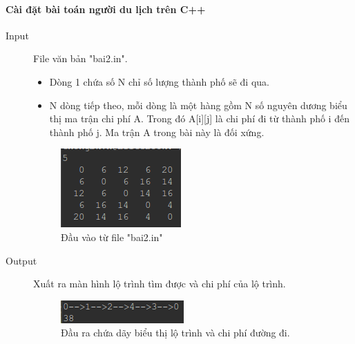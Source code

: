 \documentclass[8pt, a4paper]{article}
\newcommand{\mnt}[1]{\inputminted[frame=single, linenos=true, tabsize=4]{c++}{#1}}
\begin{document}
\paragraph{Cài đặt bài toán người du lịch trên C++}
\begin{description}
\item[Input] File văn bản "bai2.in".
\begin{itemize}
\item Dòng 1 chứa số N chỉ số lượng thành phố sẽ đi qua.
\item N dòng tiếp theo, mỗi dòng là một hàng gồm N số nguyên dương biểu thị ma trận chi phí A. Trong đó A[i][j] là chi phí đi từ thành phố i đến thành phố j. Ma trận A trong bài này là đối xứng.
\end{itemize}
\begin{figure}[htp]
\centering
\includegraphics[scale=0.50]{img/bai2_dauvao.png}
\caption{Đầu vào từ file "bai2.in"}
\label{}
\end{figure}
\item [Output] Xuất ra màn hình lộ trình tìm được và chi phí của lộ trình.
\begin{figure}[htp]
\centering
\includegraphics[scale=0.50]{img/bai2_daura.png}
\caption{Đầu ra chứa dãy biểu thị lộ trình và chi phí đường đi.}
\label{}
\end{figure}
\end{description}

\mnt{src/TSP.cpp}
\end{document}

